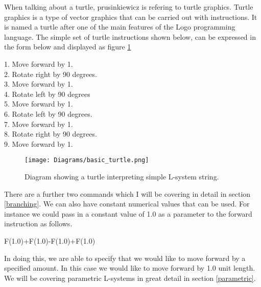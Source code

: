 \begin{flushleft}
When talking about a turtle, prusinkiewicz is refering to turtle graphics. Turtle graphics is a type of vector graphics that can be carried out with instructions. It is named a turtle after one of the main features of the Logo programming language. The simple set of turtle instructions shown below, can be expressed in the form below and displayed as figure \ref{basic turtle}\\

\vspace{5mm}

1. Move forward by 1.\\
2. Rotate right by 90 degrees.\\
3. Move forward by 1.\\
4. Rotate left by 90 degrees \\
5. Move forward by 1. \\
6. Rotate left by 90 degrees. \\
7. Move forward by 1. \\
8. Rotate right by 90 degrees. \\
9. Move forward by 1.\\

\vspace{5mm}

\begin{figure}[htbp]
	{\centering
		\vspace{7px}
		\texttt{[image: Diagrams/basic\_turtle.png]}
		\caption{Diagram showing a turtle interpreting simple L-system string.} \label{basic turtle}
	}
\end{figure}
\FloatBarrier

\vspace{5mm}

There are a further two commands which I will be covering in detail in section \ref{branching}. We can also have constant numerical values that can be used. For instance we could pass in a constant value of 1.0 as a parameter to the forward instruction as follows.

\vspace{5mm}

F(1.0)+F(1.0)-F(1.0)+F(1.0)

\vspace{5mm}

In doing this, we are able to specify that we would like to move forward by a specified amount. In this case we would like to move forward by 1.0 unit length. We will be covering parametric L-systems in great detail in section \ref{parametric}.

\end{flushleft}

